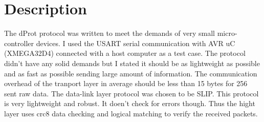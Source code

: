 \hypertarget{index_Description}{}\section{Description}\label{index_Description}
The d\-Prot protocol was written to meet the demands of very small micro-\/controller devices. I used the U\-S\-A\-R\-T serial communication with A\-V\-R u\-C (X\-M\-E\-G\-A32\-D4) connected with a host computer as a test case. The protocol didn't have any solid demands but I stated it should be as lightweight as possible and as fast as possible sending large amount of information. The communication overhead of the tranport layer in average should be less than 15 bytes for 256 sent raw data. The data-\/link layer protocol was chosen to be S\-L\-I\-P. This protocol is very lightweight and robust. It doen't check for errors though. Thus the hight layer uses crc8 data checking and logical matching to verify the received packets. 